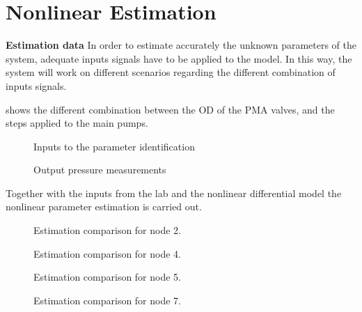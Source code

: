 \chapter{Nonlinear Estimation}
\label{NonLinResults}

\textbf{Estimation data}
In order to estimate accurately the unknown parameters of the system, adequate inputs signals have to be applied to the model. In this way, the system 
will work on different scenarios regarding the different combination of inputs signals. 

 shows the different combination between the OD of the PMA valves, and the steps applied to the main pumps. 


\begin{figure}[H]
  \centering
  \begin{minipage}[b]{0.45\textwidth}
     
    \caption{Inputs to the parameter identification}
  \end{minipage}
  \hfill
  \begin{minipage}[b]{0.45\textwidth}
     
    \caption{Output pressure measurements}
  \end{minipage}
  \label{nonlinearpumps}
\end{figure}



Together with the inputs from the lab and the nonlinear differential model the nonlinear parameter estimation is carried out. 

\begin{figure}[H]
  \centering
  \begin{minipage}[b]{0.45\textwidth}
    
    \caption{Estimation comparison for node 2.}
  \end{minipage}
  \hfill
  \begin{minipage}[b]{0.45\textwidth}
    
    \caption{Estimation comparison for node 4.}
  \end{minipage}
\end{figure}

\begin{figure}[H]
  \centering
  \begin{minipage}[b]{0.45\textwidth}
    
    \caption{Estimation comparison for node 5.}
  \end{minipage}
  \hfill
  \begin{minipage}[b]{0.45\textwidth}
    
    \caption{Estimation comparison for node 7.}
  \end{minipage}
\end{figure}

